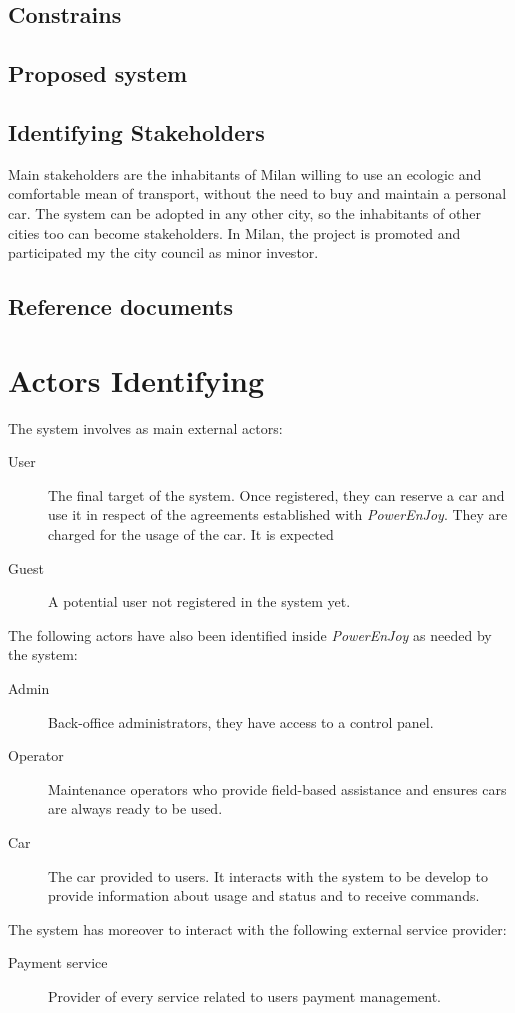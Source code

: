 \documentclass{article}
\begin{document}
		\subsection{Constrains}

		\subsection{Proposed system}

		\subsection{Identifying Stakeholders}
			Main stakeholders are the inhabitants of Milan willing to use an ecologic and comfortable mean of transport, without the need to buy and maintain a personal car.
			The system can be adopted in any other city, so the inhabitants of other cities too can become stakeholders.
			In Milan, the project is promoted and participated my the city council as minor investor.

		\subsection{Reference documents}

	\newpage
	\section{Actors Identifying}
		The system involves as main external actors:
		\begin{description}
			\item[User] The final target of the system. Once registered, they can reserve a car and use it in respect of the agreements established with \textit{PowerEnJoy}. They are charged for the usage of the car. It is expected

			\item[Guest] A potential user not registered in the system yet.
		\end{description}
		The following actors have also been identified inside \textit{PowerEnJoy} as needed by the system:
		\begin{description}
			\item[Admin] Back-office administrators, they have access to a control panel.

			\item[Operator] Maintenance operators who provide field-based assistance and ensures cars are always ready to be used.

			\item[Car] The car provided to users. It interacts with the system to be develop to provide information about usage and status and to receive commands.
		\end{description}
		The system has moreover to interact with the following external service provider:
		\begin{description}
			\item[Payment service] Provider of every service related to users payment management.
		\end{description}
\end{document}
